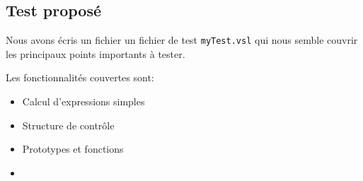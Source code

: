 \documentclass{article}
\begin{document}
\subsection{Test proposé}

Nous avons écris un fichier un fichier de test \texttt{myTest.vsl} qui nous
semble couvrir les principaux points importants à tester.

Les fonctionnalités couvertes sont:
\begin{itemize}
\item Calcul d'expressions simples
\item Structure de contrôle
\item Prototypes et fonctions
\item 
\end{itemize}
\end{document}

